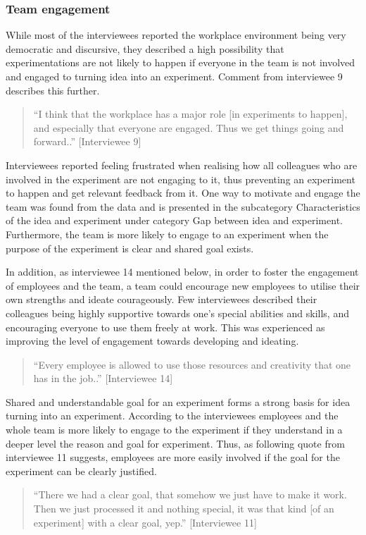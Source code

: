 \subsubsection{Team engagement}
While most of the interviewees reported the workplace environment being very democratic and discursive, they described a high possibility that experimentations are not likely to happen if everyone in the team is not involved and engaged to turning idea into an experiment. Comment from interviewee 9 describes this further.
\begin{quote}
 ``I think that the workplace has a major role [in experiments to happen], and especially that everyone are engaged. Thus we get things going and forward..'' [Interviewee 9]
\end{quote}
Interviewees reported feeling frustrated when realising how all colleagues who are involved in the experiment are not engaging to it, thus preventing an experiment to happen and get relevant feedback from it. One way to motivate and engage the team was found from the data and is presented in the subcategory Characteristics of the idea and experiment under category Gap between idea and experiment. Furthermore, the team is more likely to engage to an experiment when the purpose of the experiment is clear and shared goal exists.  

In addition, as interviewee 14 mentioned below, in order to foster the engagement of employees and the team, a team could encourage new employees to utilise their own strengths and ideate courageously. Few interviewees described their colleagues being highly supportive towards one's special abilities and skills, and encouraging everyone to use them freely at work. This was experienced as improving the level of engagement towards developing and ideating.
\begin{quote}
``Every employee is allowed to use those resources and creativity that one has in the job..'' [Interviewee 14]
\end{quote}
Shared and understandable goal for an experiment forms a strong basis for idea turning into an experiment. According to the interviewees employees and the whole team is more likely to engage to the experiment if they understand in a deeper level the reason and goal for experiment. Thus, as following quote from interviewee 11 suggests, employees are more easily involved if the goal for the experiment can be clearly justified. 
\begin{quote}
``There we had a clear goal, that somehow we just have to make it work. Then we just processed it and nothing special, it was that kind [of an experiment] with a clear goal, yep.'' [Interviewee 11]
\end{quote}

